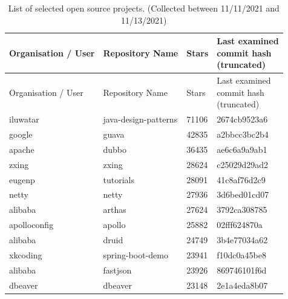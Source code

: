\vspace{1cm}

\begin{longtable}{l | l | l | l}
    \caption{List of selected open source projects. (Collected between 11/11/2021 and 11/13/2021)}\label{table:foss_projects_list}                  \\
    \hline
    Organisation / User & Repository Name           & Stars & \parbox[l][4.2em][c]{7em}{Last examined \\commit hash\\(truncated)} \\
    \hline
    \endfirsthead
    \hline
    Organisation / User & Repository Name           & Stars & \parbox[l][4.2em][c]{7em}{Last examined \\commit hash\\(truncated)} \\
    \hline
    \endhead
    iluwatar            & java-design-patterns      & 71106 & 2674cb9523a6                            \\
    google              & guava                     & 42835 & a2bbcc3bc2b4                            \\
    apache              & dubbo                     & 36435 & ae6c6a9a9ab1                            \\
    zxing               & zxing                     & 28624 & c25029d29ad2                            \\
    eugenp              & tutorials                 & 28091 & 41c8af76d2c9                            \\
    netty               & netty                     & 27936 & 3d6bed01cd07                            \\
    alibaba             & arthas                    & 27624 & 3792ca308785                            \\
    apolloconfig        & apollo                    & 25882 & 02fff624870a                            \\
    alibaba             & druid                     & 24749 & 3b4e77034a62                            \\
    xkcoding            & spring-boot-demo          & 23941 & f10dc0a45be8                            \\
    alibaba             & fastjson                  & 23926 & 869746101f6d                            \\
    dbeaver             & dbeaver                   & 23148 & 2e1a4eda8b07                            \\

\end{longtable}
